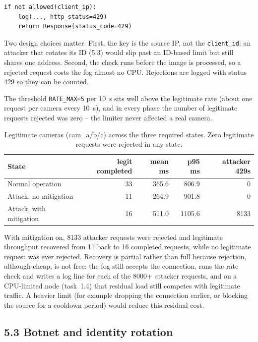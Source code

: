 \begin{lstlisting}[caption={Rate check, applied before any processing}]
if not allowed(client_ip):
    log(..., http_status=429)
    return Response(status_code=429)
\end{lstlisting}

Two design choices matter. First, the key is the source IP, not the
\texttt{client\_id}: an attacker that rotates its ID (5.3) would slip past
an ID-based limit but still shares one address. Second, the check runs
before the image is processed, so a rejected request costs the fog almost
no CPU. Rejections are logged with status 429 so they can be counted.

The threshold \texttt{RATE\_MAX=5} per 10~s sits well above the legitimate
rate (about one request per camera every 10~s), and in every phase the
number of legitimate requests rejected was zero -- the limiter never
affected a real camera.

\begin{table}[h]
\centering
\begin{tabular}{lrrrr}
\toprule
State & legit completed & mean ms & p95 ms & attacker 429s \\
\midrule
Normal operation       & 33 & 365.6 & 806.9 & 0 \\
Attack, no mitigation   & 11 & 264.9 & 901.8 & 0 \\
Attack, with mitigation & 16 & 511.0 & 1105.6 & 8133 \\
\bottomrule
\end{tabular}
\caption{Legitimate cameras (cam\_a/b/c) across the three required states.
Zero legitimate requests were rejected in any state.}
\end{table}

With mitigation on, 8133 attacker requests were rejected and legitimate
throughput recovered from 11 back to 16 completed requests, while no
legitimate request was ever rejected. Recovery is partial rather than full
because rejection, although cheap, is not free: the fog still accepts the
connection, runs the rate check and writes a log line for each of the
8000+ attacker requests, and on a CPU-limited node (task~1.4) that residual
load still competes with legitimate traffic. A heavier limit (for example
dropping the connection earlier, or blocking the source for a cooldown
period) would reduce this residual cost.

\subsection*{5.3 Botnet and identity rotation}


